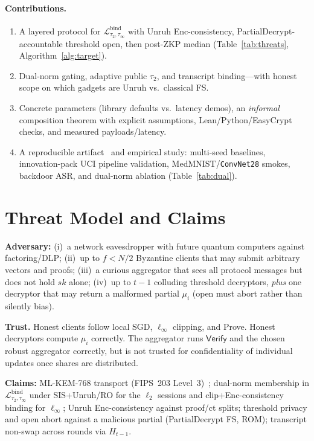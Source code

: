 \documentclass[conference]{IEEEtran}
\newcommand{\Verify}{\mathsf{Verify}}
\begin{document}
\paragraph{Contributions.}
\begin{enumerate}[leftmargin=*,nosep]
  \item A layered protocol for $\mathcal{L}_{\tau_2,\tau_\infty}^{\mathrm{bind}}$ with Unruh Enc-consistency, PartialDecrypt-accountable threshold open, then post-ZKP median (Table~\ref{tab:threats}, Algorithm~\ref{alg:target}).
  \item Dual-norm gating, adaptive public $\tau_2$, and transcript binding---with honest scope on which gadgets are Unruh vs.\ classical FS.
  \item Concrete parameters (library defaults vs.\ latency demos), an \emph{informal} composition theorem with explicit assumptions, Lean/Python/EasyCrypt checks, and measured payloads/latency.
  \item A reproducible artifact~\cite{zkflcode} and empirical study: multi-seed baselines, innovation-pack UCI pipeline validation, MedMNIST/\texttt{ConvNet28} smokes, backdoor ASR, and dual-norm ablation (Table~\ref{tab:dual}).
\end{enumerate}

\section{Threat Model and Claims}
\textbf{Adversary:} (i)~a network eavesdropper with future quantum computers against factoring/DLP; (ii)~up to $f{<}N/2$ Byzantine clients that may submit arbitrary vectors and proofs; (iii)~a curious aggregator that sees all protocol messages but does not hold $sk$ alone; (iv)~up to $t{-}1$ colluding threshold decryptors, \emph{plus} one decryptor that may return a malformed partial $\mu_i$ (open must abort rather than silently bias).

\textbf{Trust.} Honest clients follow local SGD, $\ell_\infty$ clipping, and Prove. Honest decryptors compute $\mu_i$ correctly. The aggregator runs $\Verify$ and the chosen robust aggregator correctly, but is not trusted for confidentiality of individual updates once shares are distributed.

\textbf{Claims:} ML-KEM-768 transport (FIPS~203 Level~3)~\cite{nist_fips203_2024}; dual-norm membership in $\mathcal{L}_{\tau_2,\tau_\infty}^{\mathrm{bind}}$ under SIS+Unruh/RO for the $\ell_2$ sessions and clip+Enc-consistency binding for $\ell_\infty$; Unruh Enc-consistency against proof/ct splits; threshold privacy and open abort against a malicious partial (PartialDecrypt FS, ROM); transcript non-swap across rounds via $H_{t-1}$.
\end{document}
